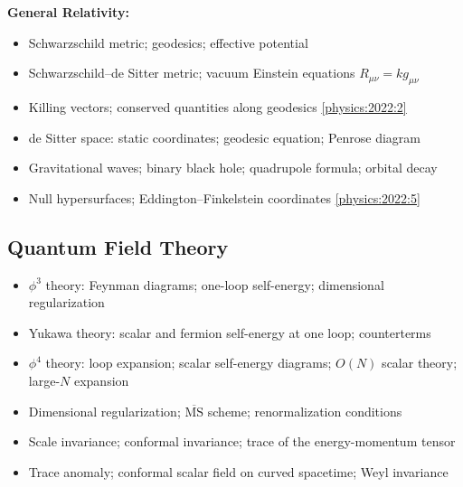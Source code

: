 \textbf{General Relativity:}
\begin{itemize}
  \item Schwarzschild metric; geodesics; effective potential
  \item Schwarzschild--de Sitter metric; vacuum Einstein equations $R_{\mu\nu}=kg_{\mu\nu}$
  \item Killing vectors; conserved quantities along geodesics \hfill \cref{physics:2022:2}
  \item de Sitter space: static coordinates; geodesic equation; Penrose diagram
  \item Gravitational waves; binary black hole; quadrupole formula; orbital decay
  \item Null hypersurfaces; Eddington--Finkelstein coordinates \hfill \cref{physics:2022:5}
\end{itemize}

\subsection{Quantum Field Theory}

\begin{itemize}
  \item $\phi^3$ theory: Feynman diagrams; one-loop self-energy; dimensional regularization
  \item Yukawa theory: scalar and fermion self-energy at one loop; counterterms
  \item $\phi^4$ theory: loop expansion; scalar self-energy diagrams; $O(N)$ scalar theory; large-$N$ expansion
  \item Dimensional regularization; $\overline{\mathrm{MS}}$ scheme; renormalization conditions
  \item Scale invariance; conformal invariance; trace of the energy-momentum tensor
  \item Trace anomaly; conformal scalar field on curved spacetime; Weyl invariance
\end{itemize}
